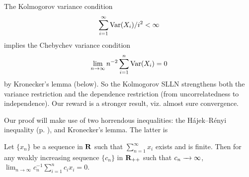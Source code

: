 \documentclass[11pt,letterpaper,reqno,oneside]{article}
\begin{document}
\begin{remark}
	The Kolmogorov variance condition
	\begin{equation*}
		\sum_{i=1}^\infty \mathrm{Var}(X_i) / i^2 < \infty
	\end{equation*}
	implies the Chebychev variance condition
	\begin{equation*}
		\lim_{n\to\infty} n^{-2} \sum_{i=1}^n \mathrm{Var}(X_i) = 0
	\end{equation*}
	by Kronecker's lemma (below). So the Kolmogorov SLLN strengthens both the variance restriction and the dependence restriction (from uncorrelatedness to independence). Our reward is a stronger result, viz. almost sure convergence.
\end{remark}


Our proof will make use of two horrendous inequalities: the Hájek--Rényi inequality (p. \pageref{theorem:Hajek-Renyi_inequality}), and Kronecker's lemma. The latter is
%
\begin{lemma}
	\label{lemma:Kroneckers_lemma}
	Let $\{ x_n \}$ be a sequence in $\mathbf{R}$ such that $\sum_{n=1}^\infty x_i$ exists and is finite. Then for any weakly increasing sequence $\{ c_n \}$ in $\mathbf{R}_{++}$ such that $c_n \xrightarrow{\;\;\;} \infty$, $\lim_{n\to\infty} c_n^{-1} \sum_{i=1}^n c_i x_i = 0$.
\end{lemma}
\end{document}

